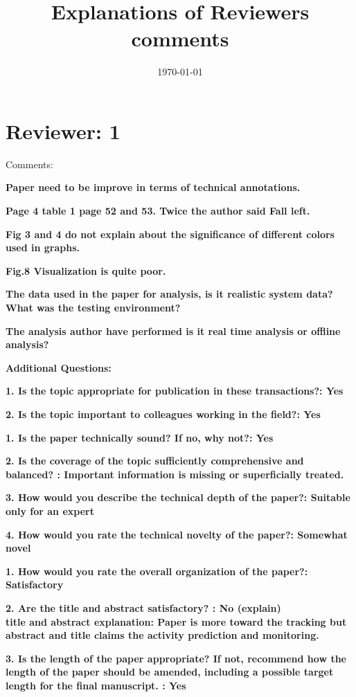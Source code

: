 \documentclass[12pt]{article}
\title{Explanations of Reviewers comments}
\date{\today}
\begin{document}
\maketitle

\section*{Reviewer: 1}


Comments:

\textbf{Paper need to be improve in terms of technical annotations.}

\textbf{Page 4 table 1 page 52 and 53. Twice the author said Fall left.}

\textbf{Fig 3 and 4 do not explain about the significance of different colors used in graphs.}

\textbf{Fig.8 Visualization is quite poor.}

\textbf{The data used in the paper for analysis, is it realistic system data? What was the testing environment?}

\textbf{The analysis author have performed is it real time analysis or offline analysis?}





\textbf{Additional Questions:}

\textbf{1. Is the topic appropriate for publication in these transactions?: Yes}

\textbf{2. Is the topic important to colleagues working in the field?: Yes}

\textbf{1. Is the paper technically sound? If no, why not?: Yes}


\textbf{2. Is the coverage of the topic sufficiently comprehensive and balanced? : Important information is missing or superficially treated.}

\textbf{3. How would you describe the technical depth of the paper?: Suitable only for an expert}

\textbf{4. How would you rate the technical novelty of the paper?: Somewhat novel}

\textbf{1. How would you rate the overall organization of the paper?: Satisfactory}

\textbf{2. Are the title and abstract satisfactory? : No (explain) \\
title and abstract explanation: Paper is more toward the tracking but abstract and title claims the activity prediction and monitoring.}

\textbf{3. Is the length of the paper appropriate? If not, recommend how the length of the paper should be amended, including a possible target length for the final manuscript. : Yes}
\end{document}
